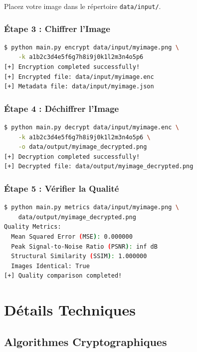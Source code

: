 \documentclass[12pt,a4paper]{report}
\begin{document}
Placez votre image dans le répertoire \texttt{data/input/}.

\subsection{Étape 3 : Chiffrer l'Image}

\begin{lstlisting}[language=bash]
$ python main.py encrypt data/input/myimage.png \
    -k a1b2c3d4e5f6g7h8i9j0k1l2m3n4o5p6
[+] Encryption completed successfully!
[+] Encrypted file: data/input/myimage.enc
[+] Metadata file: data/input/myimage.json
\end{lstlisting}

\subsection{Étape 4 : Déchiffrer l'Image}

\begin{lstlisting}[language=bash]
$ python main.py decrypt data/input/myimage.enc \
    -k a1b2c3d4e5f6g7h8i9j0k1l2m3n4o5p6 \
    -o data/output/myimage_decrypted.png
[+] Decryption completed successfully!
[+] Decrypted file: data/output/myimage_decrypted.png
\end{lstlisting}

\subsection{Étape 5 : Vérifier la Qualité}

\begin{lstlisting}[language=bash]
$ python main.py metrics data/input/myimage.png \
    data/output/myimage_decrypted.png
Quality Metrics:
  Mean Squared Error (MSE): 0.000000
  Peak Signal-to-Noise Ratio (PSNR): inf dB
  Structural Similarity (SSIM): 1.000000
  Images Identical: True
[+] Quality comparison completed!
\end{lstlisting}

\chapter{Détails Techniques}

\section{Algorithmes Cryptographiques}
\end{document}
